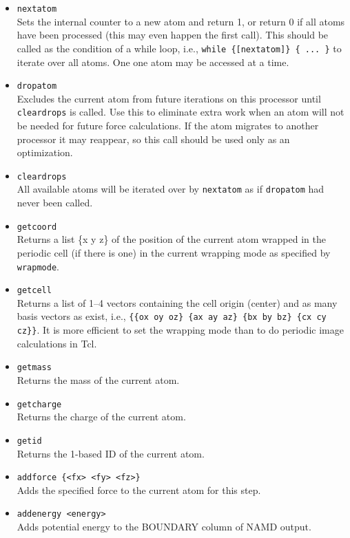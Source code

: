 \begin{itemize}

\item
{\tt nextatom} \\
Sets the internal counter to a new atom and return 1, or return 0
if all atoms have been processed (this may even happen the first call).
This should be called as the condition of a while loop, i.e.,
{\tt while \{[nextatom]\} \{ ... \}} to iterate over all atoms.
One one atom may be accessed at a time.

\item
{\tt dropatom} \\
Excludes the current atom from future iterations on this processor
until {\tt cleardrops} is called.  Use this to eliminate extra work
when an atom will not be needed for future force calculations.
If the atom migrates to another processor it may reappear, so this
call should be used only as an optimization.

\item
{\tt cleardrops} \\
All available atoms will be iterated over by {\tt nextatom} as if
{\tt dropatom} had never been called.

\item
{\tt getcoord} \\
Returns a list \{x y z\} of the position of the current atom wrapped
in the periodic cell (if there is one) in the current wrapping mode
as specified by {\tt wrapmode}.

\item
{\tt getcell} \\
Returns a list of 1--4 vectors containing the cell origin (center)
and as many basis vectors as exist, i.e.,
{\tt \{\{ox oy oz\} \{ax ay az\} \{bx by bz\} \{cx cy cz\}\}}.
It is more efficient to set the wrapping mode than to do periodic image
calculations in Tcl.

\item
{\tt getmass} \\
Returns the mass of the current atom.

\item
{\tt getcharge} \\
Returns the charge of the current atom.

\item
{\tt getid} \\
Returns the 1-based ID of the current atom.

\item
{\tt addforce \{<fx> <fy> <fz>\}} \\
Adds the specified force to the current atom for this step.

\item
{\tt addenergy <energy>} \\
Adds potential energy to the BOUNDARY column of NAMD output.

\end{itemize}


